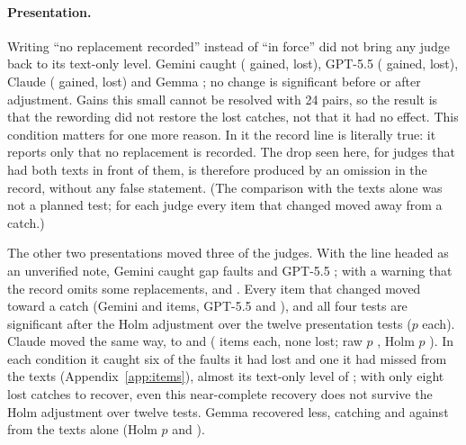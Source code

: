 \paragraph{Presentation.} Writing ``no replacement recorded'' instead of ``in force'' did not bring any judge back to
its text-only level. Gemini caught \EGeminiGapNorecord{} (\EGeminiArmNorecordGained{} gained, \EGeminiArmNorecordLost{}
lost), GPT-5.5 \EGPTGapNorecord{} (\EGPTArmNorecordGained{} gained, \EGPTArmNorecordLost{} lost), Claude
\EOpusGapNorecord{} (\EOpusArmNorecordGained{} gained, \EOpusArmNorecordLost{} lost) and Gemma \EGemmaGapNorecord; no
change is significant before or after adjustment. Gains this small cannot be resolved with 24 pairs, so the result
is that the rewording did not restore the lost catches, not that it had no effect. This condition matters for one more
reason. In it the record line is literally true: it reports only that no replacement is recorded. The drop seen here,
for judges that had both texts in front of them, is therefore produced by an omission in the record, without any
false statement. (The comparison with the texts alone was not a planned test; for each judge every item that changed
moved away from a catch.)

The other two presentations moved three of the judges. With the line headed as an unverified note, Gemini caught
\EGeminiGapLowauth{} gap faults and GPT-5.5 \EGPTGapLowauth{}; with a warning that the record omits some replacements,
\EGeminiGapCaveat{} and \EGPTGapCaveat. Every item that changed moved toward a catch (Gemini \EGeminiArmLowauthGained{}
and \EGeminiArmCaveatGained{} items, GPT-5.5 \EGPTArmLowauthGained{} and \EGPTArmCaveatGained), and all four tests are
significant after the Holm adjustment over the twelve presentation tests ($p$ \EGPTArmLowauthHolm{} each). Claude moved
the same way, to \EOpusGapLowauth{} and \EOpusGapCaveat{} (\EOpusArmLowauthGained{} items each, none lost; raw
$p$ \EOpusArmLowauthRaw, Holm $p$ \EOpusArmLowauthHolm). In each condition it caught six of the
\EOpusHTwoaLost{} faults it had lost and one it had missed from the texts (Appendix~\ref{app:items}), almost its
text-only level of \EOpusGapTexts; with only eight lost
catches to recover, even this near-complete recovery does not survive the Holm adjustment over twelve tests. Gemma recovered less,
catching \EGemmaGapLowauth{} and \EGemmaGapCaveat{} against \EGemmaGapTexts{} from the texts alone (Holm $p$
\EGemmaArmLowauthHolm{} and \EGemmaArmCaveatHolm).


